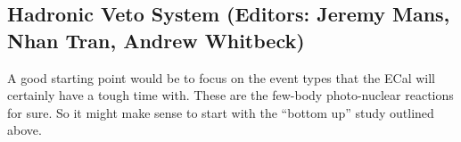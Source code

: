 
\subsection{Hadronic Veto System (Editors: Jeremy Mans, Nhan Tran, Andrew Whitbeck)}

A good starting point would be to focus on the event types that the ECal will certainly have a tough time with. These are the few-body photo-nuclear reactions for sure. So it might make sense to start with the ``bottom up'' study outlined above. 

